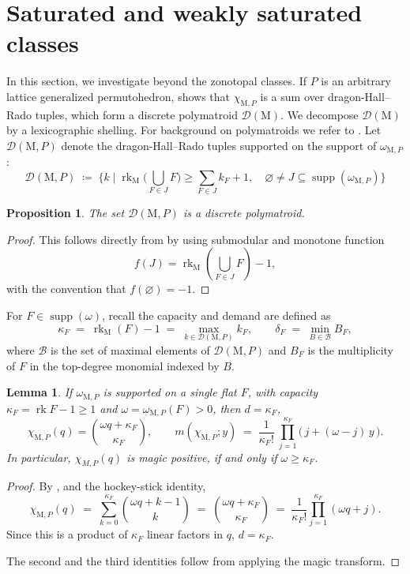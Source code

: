 \documentclass[11pt,a4paper,reqno]{amsart}
\theoremstyle{results}
\newtheorem{proposition}[thm]{Proposition}
\newtheorem{lemma}[thm]{Lemma}
\theoremstyle{definitions}
\newcommand{\rk}{\operatorname{rk}}
\newcommand{\M}{\mathrm{M}}
\DeclareMathOperator{\supp}{supp}
\newcommand{\capa}{\kappa}   %
\newcommand{\dem}{\delta}    %
\newcommand{\DHR}{\mathcal{D}}
\begin{document}
\section{Saturated and weakly saturated classes}
\label{sec:beyond}

In this section, we investigate beyond the zonotopal classes.  If $P$ is an arbitrary lattice
generalized permutohedron,  shows that $\chi_{\M,P}$ is a sum over dragon-Hall--Rado tuples, which form a discrete polymatroid $\DHR(\M)$. We decompose $\DHR(\M)$ by a lexicographic shelling. For background on
polymatroids we refer to \cite{edmonds1970submodular}. Let $\DHR(\M, P)$ denote the dragon-Hall--Rado tuples supported on the support of $\omega_{\M, P}$: 
\[
\DHR(\M, P) \; \coloneqq \; \Big\{k \mid \rk_{\M}\big(\bigcup_{F \in J} F\big)  \geqslant \sum_{F \in J} k_F  + 1, \quad \varnothing \ne J \subseteq \supp(\omega_{\M, P})\Big\}
\]

\begin{proposition}\label{prop:polymatroid}
  The set $\DHR(\M, P)$ is a discrete polymatroid.
\end{proposition}

\begin{proof}
  This follows directly from  by using submodular and monotone function 
  \[
  f(J) = \rk_{\M}(\bigcup_{F \in J} F) - 1, 
  \] with the convention that $f(\varnothing) = -1$. 
\end{proof}

For $F \in \supp(\omega)$, recall the capacity and demand are defined as 
\[
  \capa_F \;=\; \rk_{\M}(F) - 1 \;=\; \max_{k \in \DHR(\M, P)} k_F,
  \qquad
  \dem_F \;=\; \min_{B \in \mathcal{B}} B_F ,
\]
where $\mathcal{B}$ is the set of maximal elements of $\DHR(\M, P)$ and $B_F$ is the multiplicity of $F$ in the top-degree monomial indexed by $B$.

\begin{lemma}\label{lem:single-flat}
  If $\omega_{\M, P}$ is supported on a single flat $F$, with capacity
  $\capa_F = \rk F - 1 \geqslant 1$ and $\omega = \omega_{\M, P}(F) > 0$, then $d = \capa_F$,
  \[
  \chi_{\M,P}(q) = \binom{\omega q + \capa_F}{\capa_F}, 
  \qquad 
  m(\chi_{\M,P}; y) \;=\; \frac{1}{\capa_F!}\ \prod_{j=1}^{\capa_F}\big(\, j + (\omega - j)\, y \,\big).
  \]
  In particular, $\chi_{M, P}(q)$ is magic positive, if and only if $\omega \geqslant \capa_F$.
\end{lemma}

\begin{proof}
  By , and the hockey-stick identity,
  \[
    \chi_{\M,P}(q) \;=\; \sum_{k = 0}^{\capa_F} \binom{\omega q + k - 1}{k}
    \;=\; \binom{\omega q + \capa_F}{\capa_F}
    \;=\; \frac{1}{\capa_F!}\prod_{j=1}^{\capa_F} (\omega q + j) .
  \]
  Since this is a product of $\capa_F$ linear factors in $q$, $d = \capa_F$.

  The second and the third identities follow from applying the magic transform. 
\end{proof}
\end{document}
